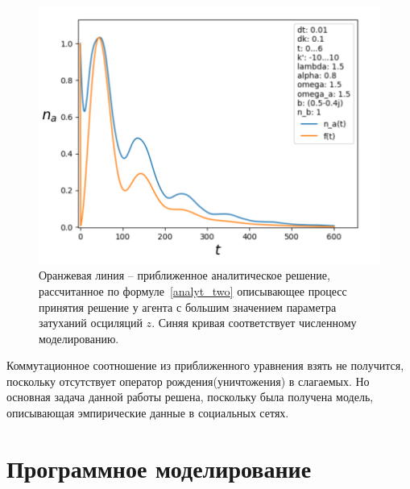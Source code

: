 \begin{figure}[h!]
    \centering
    \captionsetup{justification=centering}
    \includegraphics[width=0.7\linewidth]{pictures/result_second_6.png}
    \caption{Оранжевая линия – приближенное аналитическое решение, рассчитанное по формуле~\eqref{analyt_two}
    описывающее процесс принятия решение у агента с большим значением параметра затуханий осциляций $z$.
    Синяя кривая соответствует численному моделированию.}
    \label{fig:sr_proba_2}
\end{figure}

Коммутационное соотношение из приближенного уравнения взять не получится, поскольку отсутствует
оператор рождения(уничтожения) в слагаемых.
Но основная задача данной работы решена, поскольку была получена модель, описывающая эмпирические
данные в социальных сетях.

\section{Программное моделирование}

